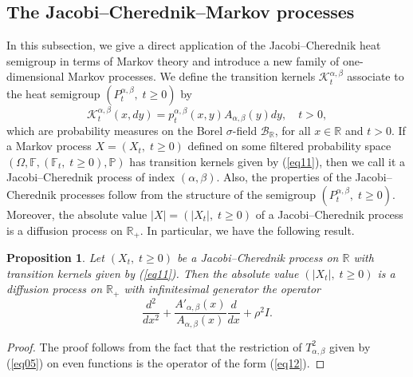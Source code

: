 \documentclass[a4paper,11pt, reqno]{amsart}
\theoremstyle{plain}
\newtheorem{proposition}[theorem]{Proposition}
\theoremstyle{definition}
\theoremstyle{remark}
\def \R{{\mathbb R}}
\def\R{\mathbb R}
\begin{document}
\subsection{The Jacobi--Cherednik--Markov processes}
In this subsection, we give a direct application of the Jacobi--Cherednik heat semigroup in terms of Markov theory and introduce a new family of one-dimensional Markov processes. We define the transition kernels $\mathcal{K}^{\alpha, \beta}_t$ associate to the heat semigroup $\left(P^{\alpha, \beta}_t, \;t \geq 0\right)$ by 
\begin{equation}\label{eq11}
\mathcal{K}^{\alpha, \beta}_t (x, dy)= p^{\alpha, \beta}_t(x, y) A_{\alpha, \beta} (y) dy, \quad t>0,
\end{equation}
which are probability measures on the Borel $\sigma$-field $\mathcal{B}_{\mathbb{R}}$, for all $x \in \mathbb{R}$ and $t>0$. If a Markov process $X = \left(X_t, \;t \geq 0\right)$ defined on some filtered probability space $\left(\Omega, \mathbb{F}, \left( \mathbb{F}_t, \;t \geq 0 \right), \mathbb{P} \right)$ has transition kernels given by (\ref{eq11}), then we call it a Jacobi--Cherednik process of index $(\alpha, \beta)$. Also, the properties of the Jacobi--Cherednik processes follow from the structure of the semigroup $\left(P^{\alpha, \beta}_t, \;t \geq 0\right)$. Moreover, the absolute value  $|X| = \left(|X_t|, \;t \geq 0\right)$ of a Jacobi--Cherednik process is a diffusion process on $\R_+$. In particular, we have the following result. 
\begin{proposition}
Let $ \left(X_t, \;t \geq 0\right)$ be a Jacobi--Cherednik process on $\mathbb{R}$ with transition kernels  given by (\ref{eq11}). Then the absolute value $ \left(|X_t|, \;t \geq 0\right)$ is a diffusion process on $\mathbb{R}_{+}$ with infinitesimal generator the operator 
\begin{equation}\label{eq12}
\frac{d^2}{dx^2} + \frac{A'_{\alpha, \beta} (x)}{A_{\alpha, \beta} (x)} \frac{d}{dx} + \rho^2 I.
\end{equation}
\end{proposition}
\begin{proof}
The proof follows from the fact that the restriction of $T^2_{\alpha, \beta}$ given by (\ref{eq05}) on even functions  is the operator of the form (\ref{eq12}). 
\end{proof}
\end{document}
